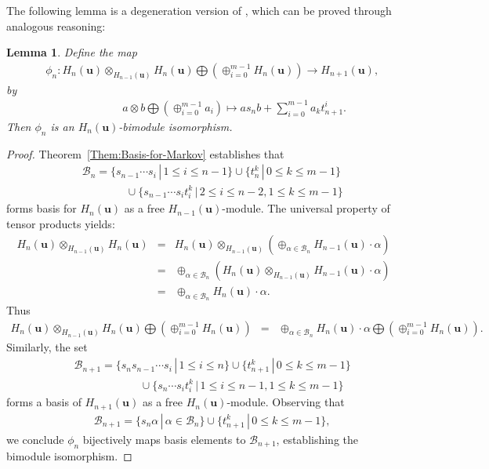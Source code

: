 \documentclass[a4paper, oneside]{amsart}
\numberwithin{equation}{section}
\newtheorem{lemma}[equation]{Lemma}
\theoremstyle{definition}
\theoremstyle{remark}
\begin{document}
The following lemma is a degeneration version of \cite[Lemma~6]{L}, which can be proved through analogous reasoning:
\begin{lemma}\label{Lemm:Bimodules-iso}Define the map
\begin{eqnarray*}
&&\phi_n:H_n(\boldsymbol{u})\otimes_{H_{n-1}(\boldsymbol{u})}H_{n}(\boldsymbol{u})\bigoplus (\oplus_{i=0}^{m-1}H_{n}(\boldsymbol{u}))\longrightarrow H_{n+1}(\boldsymbol{u}),\end{eqnarray*}
by
\begin{eqnarray*}&&\qquad\qquad a\otimes b\bigoplus (\oplus_{i=0}^{m-1}a_i)\mapsto as_nb+\sum_{i=0}^{m-1}a_kt_{n+1}^i.
\end{eqnarray*}
Then $\phi_n$ is an $H_n(\boldsymbol{u})$-bimodule isomorphism.
\end{lemma}
\begin{proof}Theorem~\ref{Them:Basis-for-Markov} establishes that
  \begin{eqnarray*}
  &&\mathscr{B}_n=\{s_{n-1}\cdots s_i\,|\,1\leq i\leq n-1\}\cup\{t_n^k\,|\,0\leq k\leq m-1\}\\
  &&\qquad\qquad\cup\{s_{n-1}\cdots s_{i}t_i^k\,|\,2\leq i\leq n-2,1\leq k\leq m-1\}
  \end{eqnarray*}
  forms basis for $H_n(\boldsymbol{u})$ as a free $H_{n-1}(\boldsymbol{u})$-module. The universal property of tensor products yields:
  \begin{eqnarray*}
  H_n(\boldsymbol{u})\otimes_{H_{n-1}(\boldsymbol{u})}H_{n}(\boldsymbol{u})&=&H_n(\boldsymbol{u})\otimes_{H_{n-1}(\boldsymbol{u})}
  (\oplus_{\alpha\in\mathscr{B}_n}H_{n-1}(\boldsymbol{u})\cdot\alpha)\\
  &=&\oplus_{\alpha\in\mathscr{B}_n} (H_n(\boldsymbol{u})\otimes_{H_{n-1}(\boldsymbol{u})}H_{n-1}(\boldsymbol{u})\cdot\alpha)\\
  &=&\oplus_{\alpha\in\mathscr{B}_n}H_n(\boldsymbol{u})\cdot\alpha.
                  \end{eqnarray*}
Thus
 \begin{eqnarray*}
  H_n(\boldsymbol{u})\otimes_{H_{n-1}(\boldsymbol{u})}H_{n}(\boldsymbol{u})\bigoplus(\oplus_{i=0}^{m-1}H_n(\boldsymbol{u}))
  &=&\oplus_{\alpha\in\mathscr{B}_n}H_n(\boldsymbol{u})\cdot\alpha\bigoplus(\oplus_{i=0}^{m-1}H_n(\boldsymbol{u})).
                  \end{eqnarray*}
Similarly, the set
  \begin{eqnarray*}
  &&\mathscr{B}_{n+1}=\{s_ns_{n-1}\cdots s_i\,|\,1\leq i\leq n\}
  \cup\{t_{n+1}^k\,|\,0\leq k\leq m-1\}\\
  &&\qquad\qquad\qquad\cup\{s_{n}\cdots s_{i}t_i^k\,|\,1\leq i\leq n-1,1\leq k\leq m-1\}
  \end{eqnarray*}
 forms a basis of $H_{n+1}(\boldsymbol{u})$ as a free $H_{n}(\boldsymbol{u})$-module. Observing that
\begin{eqnarray*}
  &&\mathscr{B}_{n+1}=\{s_n\alpha\,|\,\alpha\in\mathscr{B}_{n}\}\cup\{t_{n+1}^k\,|\,0\leq k\leq m-1\},
  \end{eqnarray*}
  we conclude $\phi_n$ bijectively maps basis elements to $\mathscr{B}_{n+1}$, establishing the  bimodule isomorphism.
\end{proof}
\end{document}
